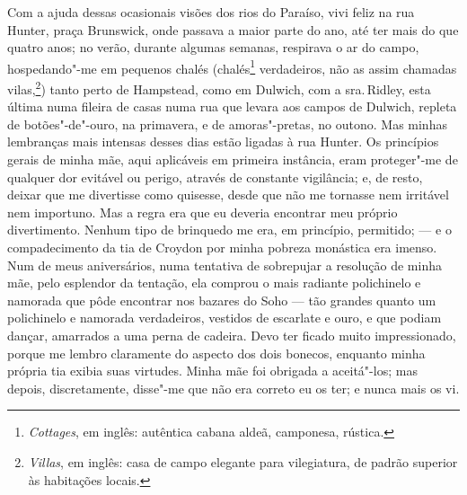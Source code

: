 Com a ajuda dessas ocasionais visões dos rios do Paraíso, vivi feliz
na rua Hunter, praça Brunswick, onde passava a maior parte do ano, até
ter mais do que quatro anos; no verão, durante algumas semanas,
respirava o ar do campo, hospedando"-me em pequenos chalés
(chalés\footnote{\textit{Cottages}, em inglês: autêntica cabana aldeã,
  camponesa, rústica.} verdadeiros, não as assim chamadas
vilas,\footnote{\textit{Villas}, em inglês: casa de campo elegante para
  vilegiatura, de padrão superior às habitações locais.})
tanto perto de Hampstead, como em Dulwich, com a sra.\,Ridley, esta
última numa fileira de casas numa rua que levara aos campos de Dulwich,
repleta de botões"-de"-ouro, na primavera, e de amoras"-pretas, no outono.
Mas minhas lembranças mais intensas desses dias estão ligadas à rua
Hunter. Os princípios gerais de minha mãe, aqui aplicáveis em primeira
instância, eram proteger"-me de qualquer dor evitável ou perigo, através
de constante vigilância; e, de resto, deixar que me divertisse como
quisesse, desde que não me tornasse nem irritável nem importuno. Mas a
regra era que eu deveria encontrar meu próprio divertimento. Nenhum tipo
de brinquedo me era, em princípio, permitido; --- e o compadecimento da
tia de Croydon por minha pobreza monástica era imenso. Num de meus
aniversários, numa tentativa de sobrepujar a resolução de minha mãe,
pelo esplendor da tentação, ela comprou o mais radiante polichinelo e
namorada que pôde encontrar nos bazares do Soho --- tão grandes quanto um
polichinelo e namorada verdadeiros, vestidos de escarlate e ouro, e que
podiam dançar, amarrados a uma perna de cadeira. Devo ter ficado muito
impressionado, porque me lembro claramente do aspecto dos dois bonecos,
enquanto minha própria tia exibia suas virtudes. Minha mãe foi obrigada
a aceitá"-los; mas depois, discretamente, disse"-me que não era correto eu
os ter; e nunca mais os vi.


